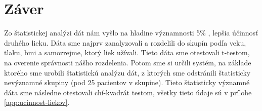 \section{Záver}

Zo štatistickej analýzi dát nám vyšlo na hladine významnosti 5\% , lepšia účinnosť druhého lieku. Dáta sme najprv zanalyzovali a rozdelili do skupín podľa veku, tlaku, bmi a samozrejme, ktorý liek užívali. Tieto dáta sme otestovali t-testom, na overenie správnosti nášho rozdelenia. Potom sme si určili systém, na základe ktorého sme urobili štatistickú analýzu dát, z ktorých sme odstránili štatisticky nevýznamné skupiny (pod 25 pacientov v skupine). Tieto štatisticky významné dáta sme následne otestovali chí-kvadrát testom, všetky tieto údaje sú v prílohe \ref{app:ucinnost-liekov}.
